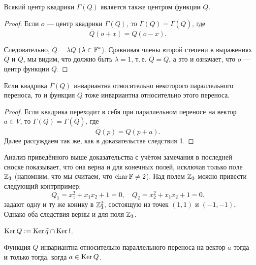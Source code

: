\begin{corollary}
    Всякий центр квадрики $\Gamma(Q)$ является также центром функции $Q$.
\end{corollary}

\begin{proof}
    Если $o$ --- центр квадрики $\Gamma(Q)$, то $\Gamma(Q) = \Gamma(\overline{Q})$, где
    \[
        \overline{Q}(o + x) = Q(o - x).
    \]

    Следовательно, $\overline{Q} = \lambda Q$ ($\lambda \in \mathbb{F}^\ast$). Сравнивая члены второй степени в выражениях $\overline{Q}$ и $Q$, мы видим, что должно быть $\lambda = 1$, т.\,е. $\overline{Q} = Q$, а это и означает, что $o$ --- центр функции $Q$.
\end{proof}

\begin{corollary}
    Если квадрика $\Gamma(Q)$ инвариантна относительно некоторого параллельного переноса, то и функция $Q$ тоже инвариантна относительно этого переноса.
\end{corollary}

\begin{proof}
    Если квадрика переходит в себя при параллельном переносе на вектор $a \in V$, то $\Gamma(Q) = \Gamma(\overline{Q})$, где
    \[
        \overline{Q}(p) = Q(p + a).
    \]
    Далее рассуждаем так же, как в доказательстве следствия 1.
\end{proof}

\begin{remark}
    Анализ приведённого выше доказательства с учётом замечания в последней сноске показывает, что она верна и для конечных полей, исключая только поле $\mathbb{Z}_3$ (напомним, что мы считаем, что $\operatorname{char}\mathbb{F} \ne 2$). Над полем $\mathbb{Z}_3$ можно привести следующий контрпример:
    \[
        Q_1 = x_1^2 + x_1x_2 + 1 = 0,\quad Q_2 = x_2^2 + x_1x_2 + 1 = 0.
    \]
    задают одну и ту же конику в $\mathbb{Z}_3^2$, состоящую из точек $(1, 1)$ и $(-1, -1)$. Однако оба следствия верны и для поля $\mathbb{Z}_3$.
\end{remark}

\begin{definition}
    $\operatorname{Ker} Q \vcentcolon = \operatorname{Ker} \widehat{q} \cap \operatorname{Ker} l$.
\end{definition}

\begin{proposal}
    Функция $Q$ инвариантна относительно параллельного переноса на вектор $a$ тогда и только тогда, когда $a \in \operatorname{Ker} Q$.
\end{proposal}


